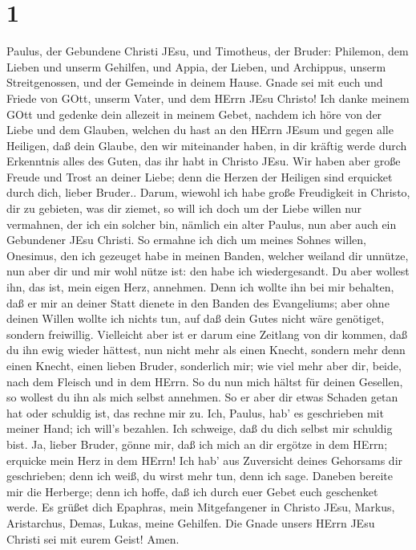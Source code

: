 \hypertarget{section}{%
\section{1}\label{section}}

 Paulus, der Gebundene Christi JEsu, und Timotheus, der
Bruder: Philemon, dem Lieben und unserm Gehilfen,  und
Appia, der Lieben, und Archippus, unserm Streitgenossen, und der
Gemeinde in deinem Hause.  Gnade sei mit euch und Friede von
GOtt, unserm Vater, und dem HErrn JEsu Christo!  Ich danke
meinem GOtt und gedenke dein allezeit in meinem Gebet, 
nachdem ich höre von der Liebe und dem Glauben, welchen du hast an den
HErrn JEsum und gegen alle Heiligen,  daß dein Glaube, den
wir miteinander haben, in dir kräftig werde durch Erkenntnis alles des
Guten, das ihr habt in Christo JEsu.  Wir haben aber große
Freude und Trost an deiner Liebe; denn die Herzen der Heiligen sind
erquicket durch dich, lieber Bruder..  Darum, wiewohl ich
habe große Freudigkeit in Christo, dir zu gebieten, was dir ziemet,
 so will ich doch um der Liebe willen nur vermahnen, der ich
ein solcher bin, nämlich ein alter Paulus, nun aber auch ein Gebundener
JEsu Christi.  So ermahne ich dich um meines Sohnes willen,
Onesimus, den ich gezeuget habe in meinen Banden,  welcher
weiland dir unnütze, nun aber dir und mir wohl nütze ist: den habe ich
wiedergesandt.  Du aber wollest ihn, das ist, mein eigen
Herz, annehmen.  Denn ich wollte ihn bei mir behalten, daß
er mir an deiner Statt dienete in den Banden des Evangeliums;
 aber ohne deinen Willen wollte ich nichts tun, auf daß
dein Gutes nicht wäre genötiget, sondern freiwillig. 
Vielleicht aber ist er darum eine Zeitlang von dir kommen, daß du ihn
ewig wieder hättest,  nun nicht mehr als einen Knecht,
sondern mehr denn einen Knecht, einen lieben Bruder, sonderlich mir; wie
viel mehr aber dir, beide, nach dem Fleisch und in dem HErrn.
 So du nun mich hältst für deinen Gesellen, so wollest du
ihn als mich selbst annehmen.  So er aber dir etwas Schaden
getan hat oder schuldig ist, das rechne mir zu.  Ich,
Paulus, hab' es geschrieben mit meiner Hand; ich will's bezahlen. Ich
schweige, daß du dich selbst mir schuldig bist.  Ja, lieber
Bruder, gönne mir, daß ich mich an dir ergötze in dem HErrn; erquicke
mein Herz in dem HErrn!  Ich hab' aus Zuversicht deines
Gehorsams dir geschrieben; denn ich weiß, du wirst mehr tun, denn ich
sage.  Daneben bereite mir die Herberge; denn ich hoffe,
daß ich durch euer Gebet euch geschenket werde.  Es grüßet
dich Epaphras, mein Mitgefangener in Christo JEsu,  Markus,
Aristarchus, Demas, Lukas, meine Gehilfen.  Die Gnade
unsers HErrn JEsu Christi sei mit eurem Geist! Amen.
